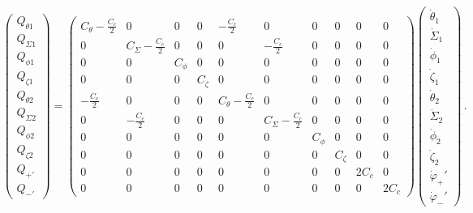 \begin{widetext}
\begin{align} \label{zp:eq:capacitance_mat}
\left(\begin{array}{c}
Q_{\theta 1} \\
Q_{\Sigma 1} \\
Q_{\phi 1} \\
Q_{\zeta 1} \\
Q_{\theta 2} \\
Q_{\Sigma 2} \\
Q_{\phi 2} \\
Q_{\zeta 2} \\
Q_{+'}\\
Q_{-'}
\end{array}\right)=\left(\begin{array}{cccccccccc}
C_\theta-\frac{C_c}{2} & 0 & 0  & 0 & -\frac{C_c}{2}  & 0 & 0  & 0 & 0  & 0 \\
0 & C_\Sigma -\frac{C_c}{2}& 0  & 0 & 0  & -\frac{C_c}{2} & 0  & 0 & 0  & 0 \\
0 & 0 & C_\phi  & 0 & 0  & 0 & 0  & 0 & 0  & 0 \\
0 & 0 & 0  & C_\zeta & 0  & 0 & 0  & 0 & 0  & 0 \\
-\frac{C_c}{2} & 0 & 0  & 0 & C_\theta -\frac{C_c}{2}  & 0 & 0  & 0 & 0  & 0 \\
0 & -\frac{C_c}{2} & 0  & 0 & 0  & C_\Sigma -\frac{C_c}{2}& 0  & 0 & 0  & 0 \\
0 & 0 & 0  & 0 & 0  & 0 & C_\phi  & 0 & 0  & 0 \\
0 & 0 & 0  & 0 & 0  & 0 & 0  & C_\zeta & 0  & 0 \\
0 & 0 & 0  & 0 & 0  & 0 & 0  & 0 & 2C_c  & 0 \\
0 & 0 & 0  & 0 & 0  & 0 & 0  & 0 & 0  & 2C_c
\end{array}\right)\left(\begin{array}{c}
\dot{\theta}_1 \\
\dot{\Sigma}_1 \\
\dot{\phi}_1 \\
\dot{\zeta}_1 \\
\dot{\theta}_2 \\
\dot{\Sigma}_2 \\
\dot{\phi}_2 \\
\dot{\zeta}_2 \\
\dot{\varphi}_+'\\
\dot{\varphi}_-'
\end{array}\right) \, .
\end{align}


\end{widetext}

